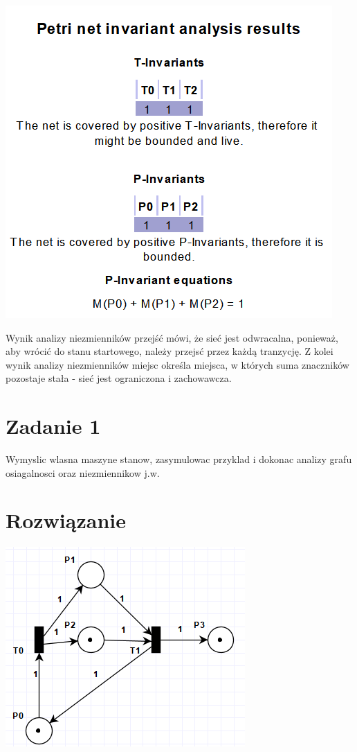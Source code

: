 \documentclass[12pt]{article}
\begin{document}
\begin{center}
\centering
    \includegraphics{cw5.png}
\end{center}
Wynik analizy niezmienników przejść mówi, że sieć jest odwracalna, ponieważ, aby wrócić do stanu startowego, należy przejsć przez każdą tranzycję. Z kolei wynik analizy niezmienników miejsc określa miejsca, w których suma znaczników pozostaje stała - sieć jest ograniczona i zachowawcza.

\section{Zadanie 1}
Wymyslic wlasna maszyne stanow, zasymulowac przyklad i dokonac analizy grafu osiagalnosci oraz niezmiennikow j.w.

\newpage
\section{Rozwiązanie}
\begin{center}
\centering
    \includegraphics{zad1_init.png}
\end{center}
\end{document}

